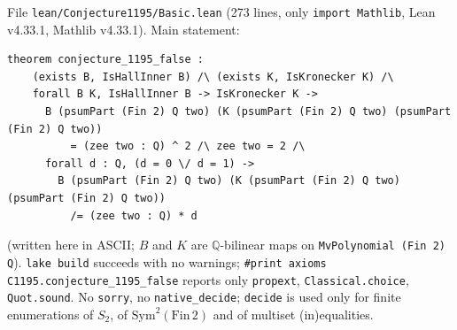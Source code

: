 \documentclass[11pt]{article}
\theoremstyle{remark}
\newcommand{\tl}{\texttt}
\begin{document}
File \tl{lean/Conjecture1195/Basic.lean} (273 lines, only \tl{import Mathlib}, Lean v4.33.1,
Mathlib v4.33.1). Main statement:
\begin{verbatim}
theorem conjecture_1195_false :
    (exists B, IsHallInner B) /\ (exists K, IsKronecker K) /\
    forall B K, IsHallInner B -> IsKronecker K ->
      B (psumPart (Fin 2) Q two) (K (psumPart (Fin 2) Q two) (psumPart (Fin 2) Q two))
          = (zee two : Q) ^ 2 /\ zee two = 2 /\
      forall d : Q, (d = 0 \/ d = 1) ->
        B (psumPart (Fin 2) Q two) (K (psumPart (Fin 2) Q two) (psumPart (Fin 2) Q two))
          /= (zee two : Q) * d
\end{verbatim}
(written here in ASCII; $B$ and $K$ are $\mathbb{Q}$-bilinear maps on \tl{MvPolynomial (Fin 2) Q}).
\tl{lake build} succeeds with no warnings; \tl{\#print axioms C1195.conjecture\_1195\_false}
reports only \tl{propext}, \tl{Classical.choice}, \tl{Quot.sound}. No \tl{sorry}, no
\tl{native\_decide}; \tl{decide} is used only for finite enumerations of $S_2$, of
$\mathrm{Sym}^2(\mathrm{Fin}\,2)$ and of multiset (in)equalities.
\end{document}
